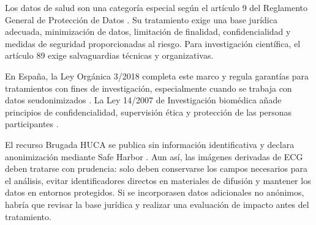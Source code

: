 Los datos de salud son una categoría especial según el artículo 9 del Reglamento General de Protección de Datos \cite{gdpr}. Su tratamiento exige una base jurídica adecuada, minimización de datos, limitación de finalidad, confidencialidad y medidas de seguridad proporcionadas al riesgo. Para investigación científica, el artículo 89 exige salvaguardias técnicas y organizativas.

En España, la Ley Orgánica 3/2018 completa este marco y regula garantías para tratamientos con fines de investigación, especialmente cuando se trabaja con datos seudonimizados \cite{lopdgdd}. La Ley 14/2007 de Investigación biomédica añade principios de confidencialidad, supervisión ética y protección de las personas participantes \cite{ley142007}.

El recurso Brugada HUCA se publica sin información identificativa y declara anonimización mediante Safe Harbor \cite{costacortez2026brugada}. Aun así, las imágenes derivadas de ECG deben tratarse con prudencia: solo deben conservarse los campos necesarios para el análisis, evitar identificadores directos en materiales de difusión y mantener los datos en entornos protegidos. Si se incorporasen datos adicionales no anónimos, habría que revisar la base jurídica y realizar una evaluación de impacto antes del tratamiento.
